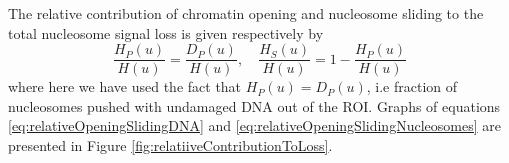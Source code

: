 \documentclass[12pt]{article}
\begin{document}
The relative contribution of chromatin opening and nucleosome
sliding to the total nucleosome signal loss is given respectively by
\begin{equation}\label{eq:relativeOpeningSlidingNucleosomes}
\frac{H_P(u)}{H(u)} = \frac{D_P(u)}{H(u)},\quad \frac{H_S(u)}{H(u)}=1-\frac{H_P(u)}{H(u)}
\end{equation}
where here we have used the fact that $H_P(u) = D_P(u)$, i.e fraction of nucleosomes pushed with undamaged DNA out of the ROI. Graphs of
equations \eqref{eq:relativeOpeningSlidingDNA} and \eqref{eq:relativeOpeningSlidingNucleosomes}  are presented in Figure \ref{fig:relatiiveContributionToLoss}.



\end{document}

